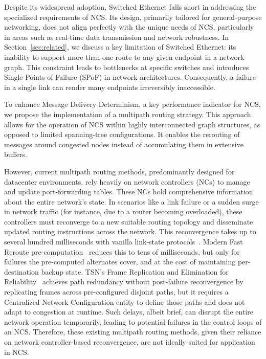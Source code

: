 Despite its widespread adoption, Switched Ethernet falls short in addressing the specialized requirements of NCS. Its design, primarily tailored for general-purpose networking, does not align perfectly with the unique needs of NCS, particularly in areas such as real-time data transmission and network robustness. In Section~\ref{sec:related}, we discuss a key limitation of Switched Ethernet: its inability to support more than one route to any given endpoint in a network graph. This constraint leads to bottlenecks at specific switches and introduces Single Points of Failure (SPoF) in network architectures. Consequently, a failure in a single link can render many endpoints irreversibly inaccessible.

To enhance Message Delivery Determinism, a key performance indicator for NCS, we propose the implementation of a multipath routing strategy. This approach allows for the operation of NCS within highly interconnected graph structures, as opposed to limited spanning-tree configurations. It enables the rerouting of messages around congested nodes instead of accumulating them in extensive buffers.

However, current multipath routing methods, predominantly designed for datacenter environments, rely heavily on network controllers (NCs) to manage and update port-forwarding tables. These NCs hold comprehensive information about the entire network's state. In scenarios like a link failure or a sudden surge in network traffic (for instance, due to a router becoming overloaded), these controllers must reconverge to a new suitable routing topology and disseminate updated routing instructions across the network. This reconvergence takes up to several hundred milliseconds with vanilla link-state protocols~\cite{eramo2008multi,farkas2009performance}. Modern Fast Reroute pre-computation~\cite{rfc5286,cisco_lfa} reduces this to tens of milliseconds, but only for failures the pre-computed alternates cover, and at the cost of maintaining per-destination backup state. TSN's Frame Replication and Elimination for Reliability~\cite{frer} achieves path redundancy without post-failure reconvergence by replicating frames across pre-configured disjoint paths, but it requires a Centralized Network Configuration entity to define those paths and does not adapt to congestion at runtime. Such delays, albeit brief, can disrupt the entire network operation temporarily, leading to potential failures in the control loops of an NCS. Therefore, these existing multipath routing methods, given their reliance on network controller-based reconvergence, are not ideally suited for application in NCS.

